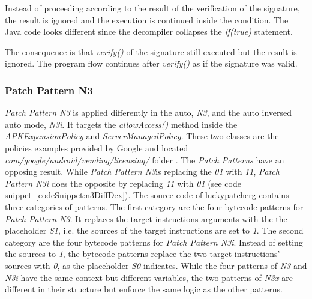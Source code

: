 Instead of proceeding according to the result of the verification of the signature, the result is ignored and the execution is continued inside the condition.
The Java code looks different since the decompiler collapses the \textit{if(true)} statement.
\newline

The consequence is that \textit{verify()} of the signature still executed but the result is ignored.
The program flow continues after  \textit{verify()} as if the signature was valid.

\subsubsection{Patch Pattern N3}
\textit{Patch Pattern N3} is applied differently in the auto, \textit{N3}, and the auto inversed auto mode, \textit{N3i}.
It targets the \textit{allowAccess()} method inside the \textit{APKExpansionPolicy} and \textit{ServerManagedPolicy}.
These two classes are the policies examples provided by Google and located \textit{com/google/android/vending/licensing/} folder \cite{developersLicensingReference}.
\newline
The \textit{Patch Patterns} have an opposing result.
While \textit{Patch Pattern N3}is replacing the \textit{01} with \textit{11}, \textit{Patch Pattern N3i} does the opposite by replacing \textit{11} with \textit{01} (see code snippet~\ref{codeSnippet:n3DiffDex}).
\newline
The source code of \gls{luckypatcherg} contains three categories of patterns.
The first category are the four bytecode patterns for \textit{Patch Pattern N3}.
It replaces the target instructions arguments with the the placeholder \textit{S1}, i.e. the sources of the target instructions are set to \textit{1}.
\newline
The second category are the four bytecode patterns for \textit{Patch Pattern N3i}.
Instead of setting the sources to \textit{1}, the bytecode patterns replace the two target instructions’ sources with \textit{0}, as the placeholder \textit{S0} indicates.
\newline
While the four patterns of \textit{N3} and \textit{N3i} have the same context but different variables, the two patterns of \textit{N3x} are different in their structure but enforce the same logic as the other patterns.
